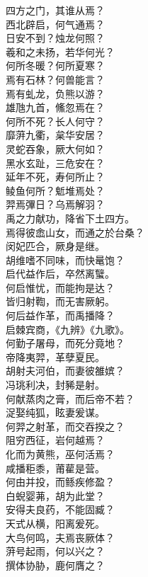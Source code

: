 \documentclass[]{article}
\begin{document}
四方之门，其谁从焉？\\
西北辟启，何气通焉？\\
日安不到？烛龙何照？\\
羲和之未扬，若华何光？\\
何所冬暖？何所夏寒？\\
焉有石林？何兽能言？\\
焉有虬龙，负熊以游？\\
雄虺九首，鯈忽焉在？\\
何所不死？长人何守？\\
靡蓱九衢，枲华安居？\\
灵蛇吞象，厥大何如？\\
黑水玄趾，三危安在？\\
延年不死，寿何所止？\\
鲮鱼何所？鬿堆焉处？\\
羿焉彃日？乌焉解羽？\\
禹之力献功，降省下土四方。\\
焉得彼嵞山女，而通之於台桑？\\
闵妃匹合，厥身是继。\\
胡维嗜不同味，而快鼌饱？\\
启代益作后，卒然离蠥。\\
何启惟忧，而能拘是达？\\
皆归射鞫，而无害厥躬。\\
何后益作革，而禹播降？\\
启棘宾商，《九辨》《九歌》。\\
何勤子屠母，而死分竟地？\\
帝降夷羿，革孽夏民。\\
胡射夫河伯，而妻彼雒嫔？\\
冯珧利决，封豨是射。\\
何献蒸肉之膏，而后帝不若？\\
浞娶纯狐，眩妻爰谋。\\
何羿之射革，而交吞揆之？\\
阻穷西征，岩何越焉？\\
化而为黄熊，巫何活焉？\\
咸播秬黍，莆雚是营。\\
何由并投，而鲧疾修盈？\\
白蜺婴茀，胡为此堂？\\
安得夫良药，不能固臧？\\
天式从横，阳离爰死。\\
大鸟何鸣，夫焉丧厥体？\\
蓱号起雨，何以兴之？\\
撰体协胁，鹿何膺之？\\
\end{document}
